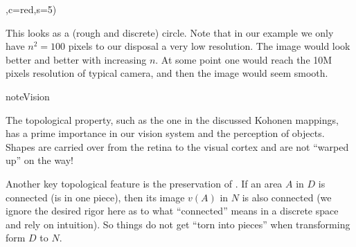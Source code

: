 \documentclass[letterpaper,10pt,english]{jupyterBook}
\begin{document}
\begin{sphinxVerbatim}[commandchars=\\\{\}]


,c=\PYGZsq{}red\PYGZsq{},s=5)

        
\end{sphinxVerbatim}

\noindent{}

\sphinxAtStartPar
This looks as a (rough and discrete) circle. Note that in our example we only have \(n^2=100\) pixels to our disposal \sphinxhyphen{} a very low resolution. The image would look better and better with increasing \(n\). At some point one would reach the 10M pixels resolution of typical camera, and then the image would seem smooth.

\begin{sphinxadmonition}{note}{Vision}

\sphinxAtStartPar
The topological property, such as the one in the discussed Kohonen mappings, has a prime importance in our vision system and the perception of objects. Shapes are carried over from the retina to the visual cortex and are not “warped up” on the way!
\end{sphinxadmonition}

\sphinxAtStartPar
Another key topological feature is the preservation of . If an area \(A\) in \(D\) is connected (is in one piece), then its image \(v(A)\) in \(N\) is also connected (we ignore the desired rigor here as to what “connected” means in a discrete space and rely on intuition). So things do not get “torn into pieces” when transforming form \(D\) to \(N\).
\end{document}
